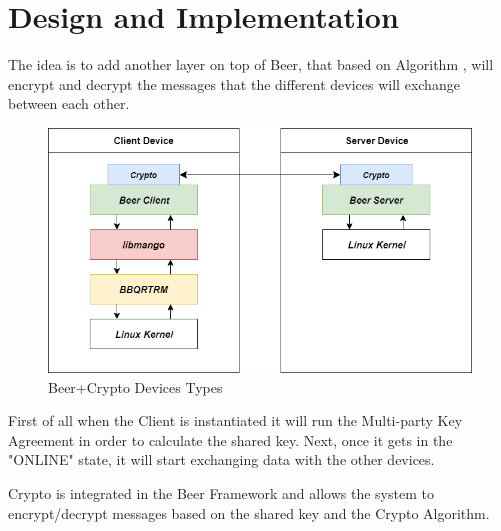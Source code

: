 \section{Design and Implementation}

The idea is to add another layer on top of Beer, that based on \color{red} Algorithm \color{black}, will encrypt and decrypt the messages that the different devices will exchange between each other.

\begin{figure}[h]
	\centering
	\includegraphics[scale=0.5]{Images/Diagrams/Beer+Crypto_Devices}
	\caption{Beer+Crypto Devices Types}
\end{figure}

First of all when the Client is instantiated it will run the Multi-party Key Agreement in order to calculate the shared key. Next, once it gets in the "ONLINE" state, it will start exchanging data with the other devices.\par
\color{red} Crypto \color{black} is integrated in the Beer Framework and allows the system to encrypt/decrypt messages based on the shared key and the \color{red} Crypto Algorithm.